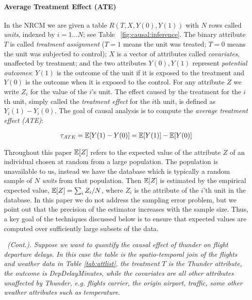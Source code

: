 \paragraph*{\bf{Average Treatment Effect (ATE)}}
In the NRCM we are given a table $R(T,X,Y(0),Y(1))$ with
$N$ rows called {\em units}, indexed by $i=1 \ldots N$; see Table~
\ref{fig:causal:inference}.  The binary attribute $T$ is called {\em
  treatment assignment} ($T=1$ means the unit was treated; $T=0$ means
the unit was subjected to control); $X$ is a vector of attributes
called {\em covariates}, unaffected by treatment; and the two
attributes $Y(0), Y(1)$ represent {\em potential outcomes}: $Y(1)$ is
the outcome of the unit if it is exposed to the treatment and $Y(0)$
is the outcome when it is exposed to the control.  For any attribute
$Z$ we write $Z_i$ for the value of the $i$'s unit.  The effect caused
by the treatment for the $i$th unit, simply called the {\em treatment
  effect} for the $i$th unit, is defined as $Y_i(1)-Y_i(0)$.  The goal
of causal analysis is to compute the {\em average treatment effect
  (ATE)}:


\vspace{-.4cm}
\begin{align}
  \ate = \E[Y(1)-Y(0)] = \E[Y(1)] - \E[Y(0)] \ignore{=\frac{1}{N} \sum_i (Y_i(1)-Y_i(0))}  \label{eq:ate}
\end{align}


Throughout this paper $\E[Z]$ refers to the expected value of the
attribute $Z$ of an individual chosen at random from a large
population.  The population is unavailable to us, instead we have the
database which is typically a random sample of $N$ {\em units} from
that population.  Then $\E[Z]$ is estimated by the empirical expected
value, $\E[Z] = \sum_i Z_i/N$, where $Z_i$ is the attribute of the
$i$'th unit in the database.  In this paper we do not address the
sampling error problem, but we point out that the precision of the
estimator increases with the sample size.  Thus, a key goal of the
techniques discussed below is to ensure that expected values are
computed over sufficiently large subsets of the data.
\vspace{-.15cm}
\begin{example} \em \label{exa1} \delay \ (Cont.). Suppose we want to
  quantify the causal effect of thunder on flight departure delays. In
  this case the table is the spatio-temporal join of the flights and
  weather data in Table \ref{tab:attlist}, the treatment $T$ is the
  Thunder attribute, the outcome is
  DepDelayMinutes, while the covariates are all other attributes
  unaffected by Thunder, e.g. flights carrier, the origin airport,
  traffic, some other weather attributes such as temperature.
\end{example}

